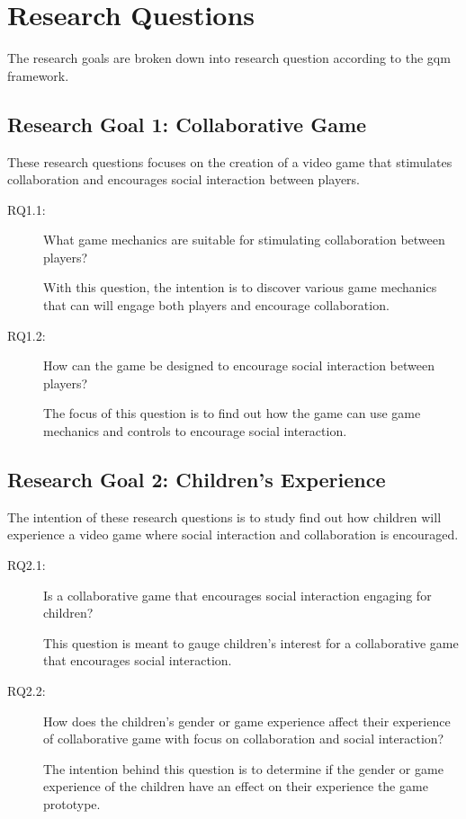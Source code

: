 
\section{Research Questions}
The research goals are broken down into research question according to the \gls{gqm} framework.
\subsection{Research Goal 1: Collaborative Game}
These research questions focuses on the creation of a video game that stimulates collaboration and encourages social interaction between players.

\begin{description}
	\item[RQ1.1:] What game mechanics are suitable for stimulating collaboration between players?
	
	With this question, the intention is to discover various game mechanics that can will engage both players and encourage collaboration.
	
	\item[RQ1.2:] How can the game be designed to encourage social interaction between players?
		
	The focus of this question is to find out how the game can use game mechanics and controls to encourage social interaction.
	
\end{description}

\subsection{Research Goal 2: Children's Experience}
The intention of these research questions is to study find out how children will experience a video game where social interaction and collaboration is encouraged.

\begin{description}
	\item[RQ2.1:] Is a collaborative game that encourages social interaction engaging for children?
	
	This question is meant to gauge children's interest for a collaborative game that encourages social interaction.
	
	\item[RQ2.2:] How does the children's gender or game experience affect their experience of collaborative game with focus on collaboration and social interaction?
	
	The intention behind this question is to determine if  the gender or game experience of the children have an effect on their experience the game prototype.
\end{description}

